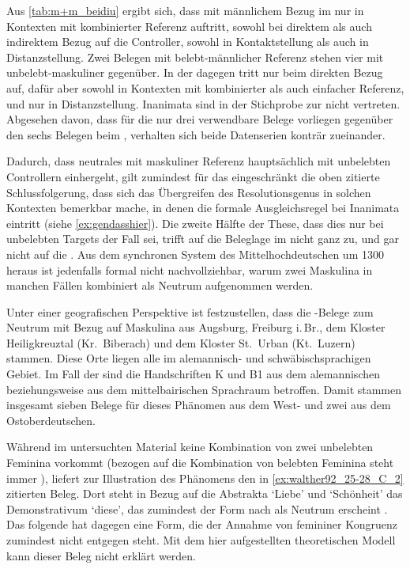 Aus \cref{tab:m+m_beidiu} ergibt sich, dass  mit männlichem Bezug
im \CAO{} nur in Kontexten mit kombinierter Referenz auftritt, sowohl bei
direktem als auch indirektem Bezug auf die Controller, sowohl in
Kontaktstellung als auch in Distanzstellung. Zwei Belegen mit belebt-männlicher
Referenz stehen vier mit unbelebt-maskuliner gegenüber. In der \KC{} dagegen
tritt  nur beim direkten Bezug auf, dafür aber sowohl in Kontexten
mit kombinierter als auch einfacher Referenz, und nur in Distanzstellung.
Inanimata sind in der Stichprobe zur \KC{} nicht vertreten. Abgesehen davon,
dass für die \KC{} nur drei verwendbare Belege vorliegen gegenüber den sechs
Belegen beim \CAO{}, verhalten sich beide Datenserien konträr zueinander.

Dadurch, dass neutrales  mit maskuliner Referenz hauptsächlich mit
unbelebten Controllern einhergeht, gilt zumindest für das \CAO{} eingeschränkt
die oben zitierte Schlussfolgerung, dass sich das Übergreifen des
Resolutionsgenus in solchen Kontexten bemerkbar mache, in denen die formale
Ausgleichsregel bei Inanimata eintritt (siehe \cref{ex:gendasshier}). Die
zweite Hälfte der These, dass dies nur bei unbelebten Targets der Fall sei,
trifft auf die Beleglage im \CAO{} nicht ganz zu, und gar nicht auf die \KC{}.
Aus dem synchronen System des Mittelhochdeutschen um 1300 heraus ist jedenfalls
formal nicht nachvollziehbar, warum zwei Maskulina in manchen Fällen kombiniert
als Neutrum aufgenommen werden.

Unter einer geografischen Perspektive ist festzustellen, dass die \CAO{}-Belege
zum Neutrum mit Bezug auf Maskulina aus Augsburg, Freiburg i.\,Br., dem Kloster
Heiligkreuztal (Kr.~Biberach) und dem Kloster St.~Urban (Kt.~Luzern) stammen.
Diese Orte liegen alle im alemannisch- und schwäbischsprachigen Gebiet. Im Fall
der \KC{} sind die Handschriften K und B1 aus dem alemannischen beziehungsweise
aus dem mittelbairischen Sprachraum betroffen. Damit stammen insgesamt sieben
Belege für dieses Phänomen aus dem West- und zwei aus dem Ost\-ober\-deutschen.

Während im untersuchten Material keine Kombination von zwei unbelebten Feminina
vorkommt (bezogen auf die Kombination von belebten Feminina steht immer
), liefert \citet[384]{paul2007} zur Illustration des Phänomens den
in \cref{ex:walther92_25-28_C_2} zitierten Beleg. Dort steht in Bezug auf die
Abstrakta  `Liebe' und  `Schönheit' das Demonstrativum
 `diese', das zumindest der Form nach als Neutrum erscheint
\autocite[485]{ksw2}. Das folgende  hat dagegen eine Form, die der
Annahme von femininer Kongruenz zumindest nicht entgegen steht. Mit dem hier
aufgestellten theoretischen Modell kann dieser Beleg nicht erklärt werden.

